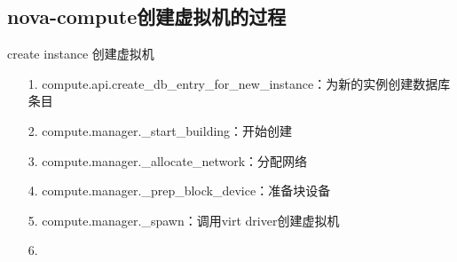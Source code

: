 \documentclass[a4paper,left=1.5cm,right=1.5cm,11pt]{article}
\begin{document}
\begin{nova的体系结构}
\subsection{nova-compute创建虚拟机的过程}
	create instance 创建虚拟机
    \begin{itemize}
        \item[1.]compute.api.create_db_entry_for_new_instance：为新的实例创建数据库条目
        \item[2.]compute.manager._start_building：开始创建
        \item[3.]compute.manager._allocate_network：分配网络
		\item[4.]compute.manager._prep_block_device：准备块设备
		\item[5.]compute.manager._spawn：调用virt driver创建虚拟机
		\item[6.]
    \end{itemize}

\end{nova的体系结构}
\end{document}
